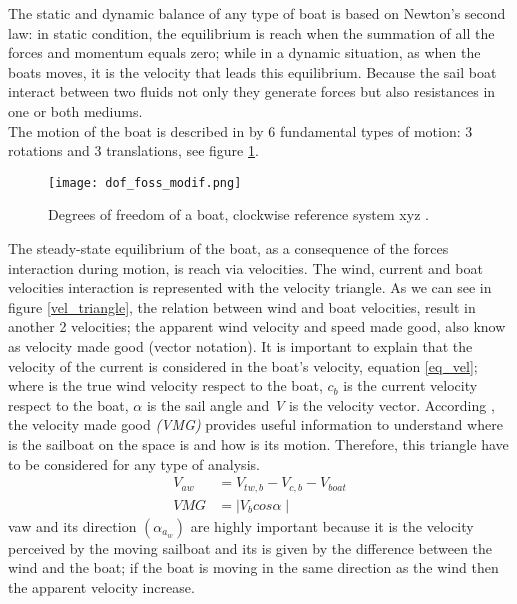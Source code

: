 The static and dynamic balance of any type of boat is based on Newton's second law:  in static condition, the equilibrium is reach when the summation of all the forces and momentum equals zero; while in a dynamic situation, as when the boats moves, it is the velocity that leads this equilibrium. Because the sail boat interact between two fluids not only they generate forces but also resistances in one or both mediums. \\ The motion of the boat is described in \cite{fossati2009aero} by 6 fundamental types of motion: 3 rotations and 3 translations, see figure \ref{DOF}. 

\begin{figure}[ht]
\centering
  \texttt{[image: dof\_foss\_modif.png]}
 \caption{Degrees of freedom of a boat, clockwise reference system xyz \cite{fossati2009aero}. }
\label{DOF}
\end{figure}
The steady-state equilibrium of the boat, as a consequence of the forces interaction during motion,  is reach via velocities. The wind, current and boat velocities interaction is represented with the velocity triangle.  As we can see in figure \ref{vel_triangle}, the relation between wind and boat velocities, result in another 2 velocities; the apparent wind velocity  and speed made good,  also know as velocity made good (vector notation). It is important to explain that the velocity of the current is considered in the boat's velocity, equation \ref{eq_vel}; where  is the true wind velocity respect to the boat,  $c_b$ is the current velocity respect to the boat, $\alpha$ is the sail angle and \textit{V} is the velocity vector. According \cite{larsonprinciples}, the velocity made good \textit{(VMG)} provides useful information to understand where is the sailboat on the space is and how is its motion. Therefore, this triangle have to be considered for any type of analysis.
\begin{equation} [ht]
\label{eq_vel}
\begin{aligned}
V_{aw} & = V_{tw,b} - V_{c,b} - V_{boat} \\ 
VMG &=  \mid V_b cos \alpha  \mid 
\end{aligned}
\end {equation}
vaw and its direction $( \alpha_{a_w})$ are highly important because it is the velocity perceived by the moving sailboat and its is given by the difference between the wind and the boat; if the boat is moving in the same direction as the wind then the apparent velocity increase. 


